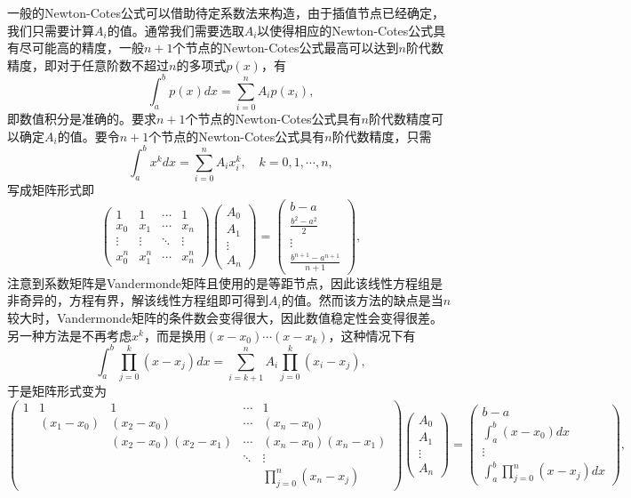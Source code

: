 \documentclass[a4paper,10pt]{ctexart}
\begin{document}
一般的Newton-Cotes公式可以借助待定系数法来构造，由于插值节点已经确定，我们只需要计算$ A_i $的值。通常我们需要选取$ A_i $以使得相应的Newton-Cotes公式具有尽可能高的精度，一般$ n+1 $个节点的Newton-Cotes公式最高可以达到$ n $阶代数精度，即对于任意阶数不超过$ n $的多项式$ p(x) $，有
\[
    \int_a^b p(x)dx = \sum_{i=0}^n A_i p(x_i),
\]
即数值积分是准确的。要求$ n+1 $个节点的Newton-Cotes公式具有$ n $阶代数精度可以确定$ A_i $的值。要令$ n+1 $个节点的Newton-Cotes公式具有$ n $阶代数精度，只需
\begin{equation}
    \int_a^b x^k dx = \sum_{i=0}^n A_i x_i^k,\quad k=0,1,\cdots ,n,
\end{equation}
写成矩阵形式即
\[
    \begin{pmatrix}
        1 & 1 & \cdots & 1\\
        x_0 & x_1 & \cdots & x_n\\
        \vdots & \vdots & \ddots & \vdots\\
        x_0^n & x_1^n & \cdots & x_n^n
    \end{pmatrix}
    \begin{pmatrix}
        A_0\\
        A_1\\
        \vdots\\
        A_n
    \end{pmatrix}
    =
    \begin{pmatrix}
        b-a\\
        \frac{b^2-a^2}{2}\\
        \vdots\\
        \frac{b^{n+1}-a^{n+1}}{n+1}
    \end{pmatrix},
\]
注意到系数矩阵是Vandermonde矩阵且使用的是等距节点，因此该线性方程组是非奇异的，方程有界，解该线性方程组即可得到$ A_i $的值。然而该方法的缺点是当$ n $较大时，Vandermonde矩阵的条件数会变得很大，因此数值稳定性会变得很差。另一种方法是不再考虑$ x^k $，而是换用$ (x-x_0)\cdots (x-x_k) $，这种情况下有
\begin{equation}
    \int_a^b \prod_{j=0}^k (x-x_j)dx = \sum_{i=k+1}^n A_i \prod_{j=0}^k (x_i-x_j),
\end{equation}
于是矩阵形式变为
\[
    \begin{pmatrix} 
         1  & 1 & 1 & \cdots & 1\\
            & (x_1-x_0) & (x_2-x_0) & \cdots & (x_n-x_0)\\
            &  & (x_2-x_0)(x_2-x_1) & \cdots & (x_n-x_0)(x_n-x_1)\\
            &  &  & \ddots & \vdots\\
            &  &  &  & \prod_{j=0}^n (x_n-x_j)
    \end{pmatrix} 
    \begin{pmatrix}
        A_0\\
        A_1\\
        \vdots\\
        A_n
    \end{pmatrix}
    =
    \begin{pmatrix}
        b-a\\
        \int_a^b (x-x_0)dx\\
        \vdots\\
        \int_a^b \prod_{j=0}^n (x-x_j)dx
    \end{pmatrix},
\]
\end{document}
